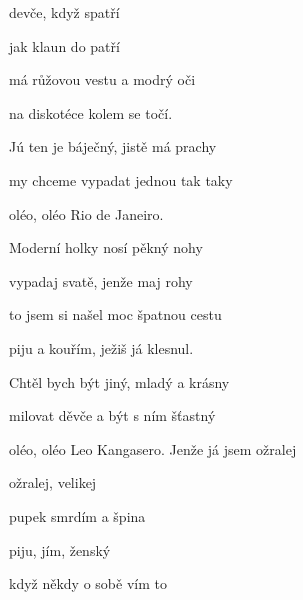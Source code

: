 
\zs
{} devče, když  spatří

 jak klaun do  patří

má růžovou vestu a modrý oči

na diskotéce kolem se točí.

Jú ten je báječný, jistě má prachy

my chceme vypadat jednou tak taky

oléo, oléo Rio de Janeiro.
\ks

\zs
Moderní holky nosí pěkný nohy

vypadaj svatě, jenže maj rohy

to jsem si našel moc špatnou cestu

piju a kouřím, ježiš já klesnul.

Chtěl bych být jiný, mladý a krásny

milovat děvče a být s ním šťastný

oléo, oléo Leo Kangasero.
\ks
\zr
Jenže já jsem  ožralej

 ožralej,  velikej

pupek smrdím a  špina

 piju, jím, ženský 

 když někdy o sobě vím  to 
\kr
\kp




